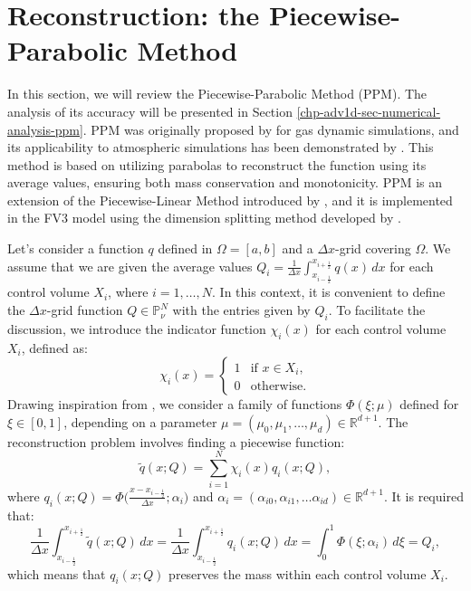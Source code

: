 \section{Reconstruction: the Piecewise-Parabolic Method}
\label{chp-adv1d-sec-recon}
In this section, we will review the Piecewise-Parabolic Method (PPM).
The analysis of its accuracy will be presented in Section \ref{chp-adv1d-sec-numerical-analysis-ppm}.
PPM was originally proposed by \citet{colella:1984} for gas dynamic simulations, and its applicability
to atmospheric simulations has been demonstrated by \citet{carpenter:1990}.
This method is based on utilizing parabolas to reconstruct the function using its average values,
ensuring both mass conservation and monotonicity. PPM is an extension of the Piecewise-Linear Method
introduced by \citet{vanleer:1977}, and it is implemented in the FV3 model using the dimension
splitting method developed by \citet{lin:1996}.

Let's consider a function ${q}$ defined in $\Omega=[a,b]$ and a $\Delta x$-grid covering $\Omega$.
We assume that we are given the average values ${Q}_i = \frac{1}{\Delta x} \int_{x_{i-\frac{1}{2}}}^{x_{i+\frac{1}{2}}} {q}(x) \,dx$
for each control volume $X_i$, where $i = 1, \ldots, N$.
In this context, it is convenient to define the $\Delta x$-grid function $Q\in \mathbb{P}^{N}_{\nu}$ with the entries given by $Q_i$.
To facilitate the discussion, we introduce the indicator function $\chi_{i}(x)$ for each control volume $X_i$, defined as:
\begin{equation*}
	\label{chp-adv1d-sec3-1-eq1}
	\chi_{i}(x)=
	\begin{cases}
		1 & \text{if } x \in X_i,\\
		0 & \text{otherwise.}
	\end{cases}
\end{equation*}
Drawing inspiration from \citet[Chapter~1]{stoer:2002}, we consider a family of functions $\Phi(\xi;\mu)$
defined for $\xi \in [0,1]$, depending on a parameter $\mu =(\mu_0, \mu_1,\ldots, \mu_d)\in \mathbb{R}^{d+1}$.
The reconstruction problem involves finding a piecewise function:
\begin{equation}
	\label{chp-adv1d-sec3-1-eq2}
	\tilde{q}(x;Q) = \sum_{i=1}^{N} \chi_i(x) q_i(x;Q),
\end{equation}
where $q_i(x;Q) = \Phi\big(\frac{x-x_{i-\frac{1}{2}}}{\Delta x};\alpha_i\big)$ and
$\alpha_i= (\alpha_{i0},\alpha_{i1}, \ldots \alpha_{id})\in\mathbb{R}^{d+1}$. It is required that:
\begin{equation*}
	\frac{1}{\Delta x}\int_{x_{i-\frac{1}{2}}}^{x_{i+\frac{1}{2}}} \tilde{q}(x;Q) \,dx =
	\frac{1}{\Delta x}\int_{x_{i-\frac{1}{2}}}^{x_{i+\frac{1}{2}}} q_i(x;Q) \,dx =
	\int_{0}^{1} \Phi(\xi;\alpha_i) \,d\xi = {Q}_i,
\end{equation*}
which means that $q_i(x;Q)$ preserves the mass within each control volume $X_i$.

